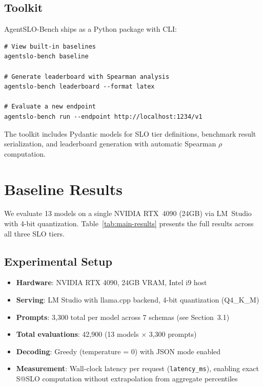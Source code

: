 \documentclass[11pt]{article}
\begin{document}
\subsection{Toolkit}

AgentSLO-Bench ships as a Python package with CLI:

\begin{lstlisting}
# View built-in baselines
agentslo-bench baseline

# Generate leaderboard with Spearman analysis
agentslo-bench leaderboard --format latex

# Evaluate a new endpoint
agentslo-bench run --endpoint http://localhost:1234/v1
\end{lstlisting}

The toolkit includes Pydantic models for SLO tier definitions, benchmark result serialization, and leaderboard generation with automatic Spearman $\rho$ computation.

\section{Baseline Results}

We evaluate 13 models on a single NVIDIA RTX~4090 (24GB) via LM~Studio with 4-bit quantization.  Table~\ref{tab:main-results} presents the full results across all three SLO tiers.

\subsection{Experimental Setup}

\begin{itemize}[leftmargin=*]
\item \textbf{Hardware}: NVIDIA RTX 4090, 24GB VRAM, Intel i9 host
\item \textbf{Serving}: LM Studio with llama.cpp backend, 4-bit quantization (Q4\_K\_M)
\item \textbf{Prompts}: 3{,}300 total per model across 7 schemas (see Section~3.1)
\item \textbf{Total evaluations}: 42{,}900 (13 models $\times$ 3{,}300 prompts)
\item \textbf{Decoding}: Greedy (temperature = 0) with JSON mode enabled
\item \textbf{Measurement}: Wall-clock latency per request (\texttt{latency\_ms}), enabling exact S@SLO computation without extrapolation from aggregate percentiles
\end{itemize}
\end{document}
